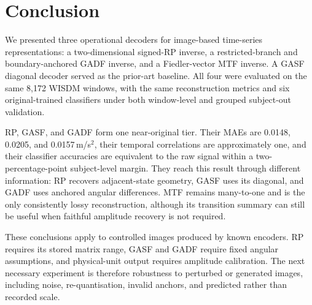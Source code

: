 \documentclass[10pt,a4paper,parskip=half-]{scrartcl}
\begin{document}
\section{Conclusion}
\label{sec:conclusion}

We presented three operational decoders for image-based time-series representations: a two-dimensional signed-RP inverse, a restricted-branch and boundary-anchored GADF inverse, and a Fiedler-vector MTF inverse. A GASF diagonal decoder served as the prior-art baseline. All four were evaluated on the same 8,172 WISDM windows, with the same reconstruction metrics and six original-trained classifiers under both window-level and grouped subject-out validation.

RP, GASF, and GADF form one near-original tier. Their MAEs are 0.0148, 0.0205, and 0.0157\,m/s$^2$, their temporal correlations are approximately one, and their classifier accuracies are equivalent to the raw signal within a two-percentage-point subject-level margin. They reach this result through different information: RP recovers adjacent-state geometry, GASF uses its diagonal, and GADF uses anchored angular differences. MTF remains many-to-one and is the only consistently lossy reconstruction, although its transition summary can still be useful when faithful amplitude recovery is not required.

These conclusions apply to controlled images produced by known encoders. RP requires its stored matrix range, GASF and GADF require fixed angular assumptions, and physical-unit output requires amplitude calibration. The next necessary experiment is therefore robustness to perturbed or generated images, including noise, re-quantisation, invalid anchors, and predicted rather than recorded scale.
\end{document}
